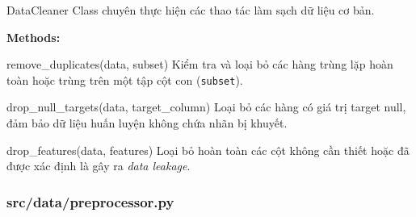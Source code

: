 \documentclass[12pt,a4paper]{article}
\newenvironment{methodlist}{
    \begin{description}[style=nextline, font=\ttfamily\color{sklearn-blue}]
}{
    \end{description}
}
\begin{document}
\begin{classbox}{DataCleaner}
Class chuyên thực hiện các thao tác làm sạch dữ liệu cơ bản.

\vspace{0.2cm}
\textbf{Methods:}
\begin{methodlist}
    \item[remove\_duplicates(data, subset)] 
    Kiểm tra và loại bỏ các hàng trùng lặp hoàn toàn hoặc trùng trên một tập cột con (\texttt{subset}).
    
    \item[drop\_null\_targets(data, target\_column)] 
    Loại bỏ các hàng có giá trị target null, đảm bảo dữ liệu huấn luyện không chứa nhãn bị khuyết.
    
    \item[drop\_features(data, features)] 
    Loại bỏ hoàn toàn các cột không cần thiết hoặc đã được xác định là gây ra \textit{data leakage}.
\end{methodlist}
\end{classbox}

\subsubsection{src/data/preprocessor.py}
\end{document}
